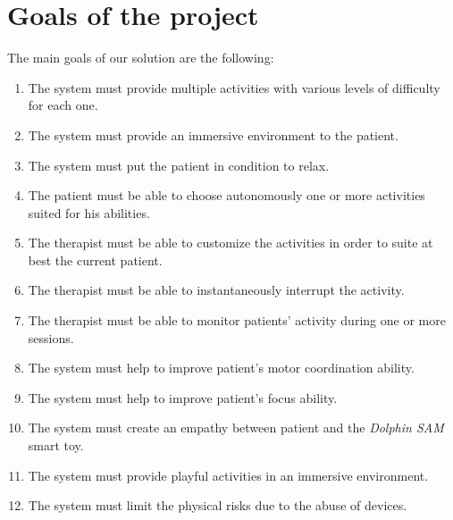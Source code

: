 \section{Goals of the project}
The main goals of our solution are the following:
\begin{enumerate}
	\item The system must provide multiple activities with various levels of difficulty for each one.
	\item The system must provide an immersive environment to the patient. 
	\item The system must put the patient in condition to relax.
	\item The patient must be able to choose autonomously one or more activities suited for his abilities.
	\item The therapist must be able to customize the activities in order to suite at best the current patient.
	\item The therapist must be able to instantaneously interrupt the activity.
	\item The therapist must be able to monitor patients’ activity during one or more sessions.
	\item The system must help to improve patient’s motor coordination ability.
	\item The system must help to improve patient’s focus ability.
	\item The system must create an empathy between patient and the \textit{Dolphin SAM} smart toy.
	\item The system must provide playful activities in an immersive environment.
	\item The system must limit the physical risks due to the abuse of devices.
\end{enumerate}
